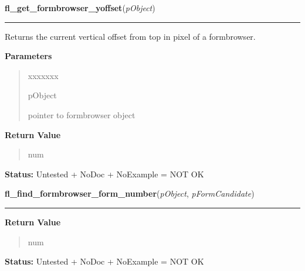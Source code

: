 \hspace{.8\funcindent}\begin{boxedminipage}{\funcwidth}

    \raggedright \textbf{fl\_get\_formbrowser\_yoffset}(\textit{pObject})

    \vspace{-1.5ex}

    \rule{\textwidth}{0.5\fboxrule}
\setlength{\parskip}{2ex}
    Returns the current vertical offset from top in pixel of a formbrowser.

\setlength{\parskip}{1ex}
      \textbf{Parameters}
      \vspace{-1ex}

      \begin{quote}
        \begin{Ventry}{xxxxxxx}

          \item[pObject]

          pointer to formbrowser object

        \end{Ventry}

      \end{quote}

      \textbf{Return Value}
    \vspace{-1ex}

      \begin{quote}
      num

      \end{quote}

\textbf{Status:} Untested + NoDoc + NoExample = NOT OK



    \end{boxedminipage}

    \label{xformslib:library:fl_find_formbrowser_form_number}

    \vspace{0.5ex}

\hspace{.8\funcindent}\begin{boxedminipage}{\funcwidth}

    \raggedright \textbf{fl\_find\_formbrowser\_form\_number}(\textit{pObject}, \textit{pFormCandidate})

    \vspace{-1.5ex}

    \rule{\textwidth}{0.5\fboxrule}
\setlength{\parskip}{2ex}
\setlength{\parskip}{1ex}
      \textbf{Return Value}
    \vspace{-1ex}

      \begin{quote}
      num

      \end{quote}

\textbf{Status:} Untested + NoDoc + NoExample = NOT OK



    \end{boxedminipage}

